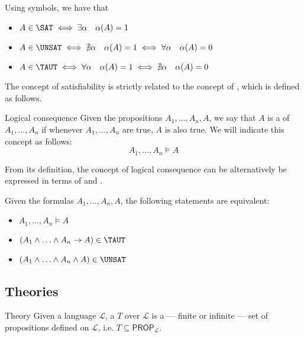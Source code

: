 \documentclass[a4paper, 12pt]{report}
\begin{document}
    Using symbols, we have that

    \begin{itemize}
        \item $A \in \SAT \iff \exists \alpha \quad \alpha (A) = 1$
        \item $A \in \UNSAT \iff \nexists \alpha \quad \alpha (A) = 1 \iff \forall \alpha \quad \alpha (A) = 0$
        \item $A \in \TAUT \iff \forall \alpha \quad \alpha(A) = 1 \iff \nexists \alpha \quad \alpha (A) = 0$
    \end{itemize}
    
    The concept of satisfiability is strictly related to the concept of , which is defined as follows.

    \begin{frameddefn}{Logical consequence}
        Given the propositions $A_1, \ldots, A_n, A$, we say that $A$ is a  of $A_1, \ldots, A_n$ if whenever $A_1, \ldots, A_n$ are true, $A$ is also true. We will indicate this concept as follows: $$A_1, \ldots, A_n \models A$$
    \end{frameddefn}

    From its definition, the concept of logical consequence can be alternatively be expressed in terms of  and .

    \begin{framedthm}{}
        Given the formulas $A_1, \ldots, A_n, A$, the following statements are equivalent:

        \begin{itemize}
            \item $A_1, \ldots, A_n \models A$
            \item $(A_1 \land \ldots \land A_n \rightarrow A) \in \TAUT$
            \item $(A_1 \land \ldots \land A_n \land A) \in \UNSAT$
        \end{itemize}
    \end{framedthm}

    \subsection{Theories}

    \begin{frameddefn}{Theory}
        Given a language $\mathcal L$, a  $T$ over $\mathcal L$ is a --- finite or infinite --- set of propositions defined on $\mathcal L$, i.e. $T \subseteq \textsf{PROP}_{\mathcal L}$.
    \end{frameddefn}
\end{document}
